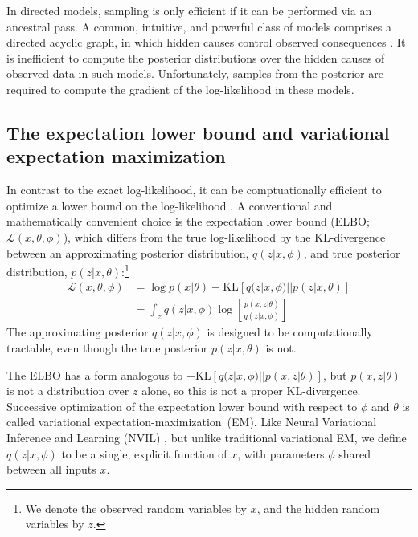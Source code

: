 \documentclass{article} %
\def\KL{\text{KL}}
\begin{document}
In directed models, sampling is only efficient if it can be performed via an ancestral pass.    %
A common, intuitive, and powerful class of models comprises a directed acyclic graph, in which hidden causes control observed consequences \cite{hinton2006fast}.  
It is inefficient to compute the posterior distributions over the hidden causes of observed data in such models.
Unfortunately, samples from the posterior are required to compute the gradient of the log-likelihood in these models.  

\subsection{The expectation lower bound and variational expectation maximization}

In contrast to the exact log-likelihood, it can be comptuationally efficient to optimize a lower bound on the log-likelihood \cite{jordan1999introduction}.  A conventional and mathematically convenient choice is the expectation lower bound (ELBO; $\mathcal{L}(x, \theta, \phi)$), which differs from the true log-likelihood by the KL-divergence between an approximating posterior distribution, $q(z | x, \phi)$, and true posterior distribution, $p(z | x, \theta)$:\footnote{We denote the observed random variables by $x$, and the hidden random variables by $z$.}  
\begin{align}
\mathcal{L}(x, \theta, \phi) &= \log p(x | \theta) - \KL[q(z | x, \phi)||p(z|x,\theta)] \label{variational-inference-equation} \\
&= \int_z q(z | x, \phi) \log\left[ \frac{p(x, z | \theta)}{q(z | x, \phi)} \right] \nonumber %
\end{align}
The approximating posterior $q(z | x, \phi)$ is designed to be computationally tractable, even though the true posterior $p(z | x, \theta)$ is not.  

The ELBO has a form analogous to $-\KL\left[q(z|x, \phi) || p(x,z|\theta)\right]$, but $p(x,z|\theta)$ is not a distribution over $z$ alone, so this is not a proper KL-divergence.  
Successive optimization of the expectation lower bound with respect to $\phi$ and $\theta$ is called variational expectation-maximization~(EM).
Like Neural Variational Inference and Learning (NVIL) \cite{mnih2014neural}, but unlike traditional variational EM, we define $q(z | x, \phi)$ to be a single, explicit function of $x$, with parameters $\phi$ shared between all inputs $x$.
\end{document}
